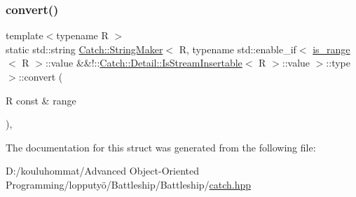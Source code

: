 \subsubsection{\texorpdfstring{convert()}{convert()}}
{\footnotesize\ttfamily template$<$typename R $>$ \\
static std\+::string \mbox{\hyperlink{struct_catch_1_1_string_maker}{Catch\+::\+String\+Maker}}$<$ R, typename std\+::enable\+\_\+if$<$ \mbox{\hyperlink{struct_catch_1_1is__range}{is\+\_\+range}}$<$ R $>$\+::value \&\&!\+::\mbox{\hyperlink{class_catch_1_1_detail_1_1_is_stream_insertable}{Catch\+::\+Detail\+::\+Is\+Stream\+Insertable}}$<$ R $>$\+::value $>$\+::type $>$\+::convert (\begin{DoxyParamCaption}\item[{R const \&}]{range }\end{DoxyParamCaption})\hspace{0.3cm}{\ttfamily [inline]}, {\ttfamily [static]}}



The documentation for this struct was generated from the following file\+:\begin{DoxyCompactItemize}
\item 
D\+:/kouluhommat/\+Advanced Object-\/\+Oriented Programming/lopputyö/\+Battleship/\+Battleship/\mbox{\hyperlink{catch_8hpp}{catch.\+hpp}}\end{DoxyCompactItemize}
